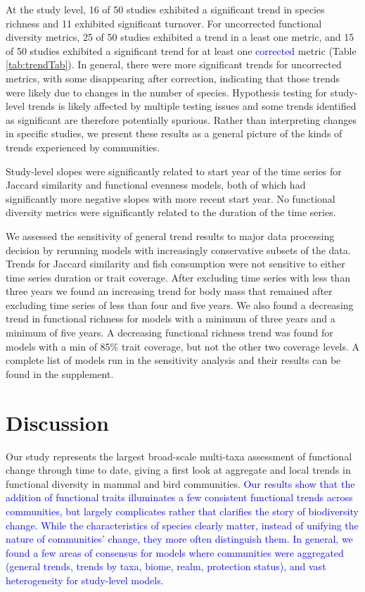 \documentclass{article}
\begin{document}
At the study level, 16 of 50 studies exhibited a significant trend in
species richness and 11 exhibited significant turnover. For uncorrected
functional diversity metrics, 25 of 50 studies exhibited a trend in a
least one metric, and 15 of 50 studies exhibited a significant trend for
at least one \textcolor{blue}{corrected} metric (Table
\ref{tab:trendTab}). In general, there were more significant trends for
uncorrected metrics, with some disappearing after correction, indicating
that those trends were likely due to changes in the number of species.
Hypothesis testing for study-level trends is likely affected by multiple
testing issues and some trends identified as significant are therefore
potentially spurious. Rather than interpreting changes in specific
studies, we present these results as a general picture of the kinds of
trends experienced by communities.

Study-level slopes were significantly related to start year of the time
series for Jaccard similarity and functional evenness models, both of
which had significantly more negative slopes with more recent start
year. No functional diversity metrics were significantly related to the
duration of the time series.

We assessed the sensitivity of general trend results to major data
processing decision by rerunning models with increasingly conservative
subsets of the data. Trends for Jaccard similarity and fish consumption
were not sensitive to either time series duration or trait coverage.
After excluding time series with less than three years we found an
increasing trend for body mass that remained after excluding time series
of less than four and five years. We also found a decreasing trend in
functional richness for models with a minimum of three years and a
minimum of five years. A decreasing functional richness trend was found
for models with a min of 85\% trait coverage, but not the other two
coverage levels. A complete list of models run in the sensitivity
analysis and their results can be found in the supplement.

\hypertarget{discussion}{%
\section{Discussion}\label{discussion}}

Our study represents the largest broad-scale multi-taxa assessment of
functional change through time to date, giving a first look at aggregate
and local trends in functional diversity in mammal and bird communities.
\textcolor{blue}{Our results show that the addition of functional traits illuminates a few consistent functional trends across communities, but largely complicates rather that clarifies the story of biodiversity change. While the characteristics of species clearly matter, instead of unifying the nature of communities' change, they more often distinguish them. In general, we found a few areas of consensus for models where communities were aggregated (general trends, trends by taxa, biome, realm, protection status), and vast heterogeneity for study-level models.}
\end{document}

